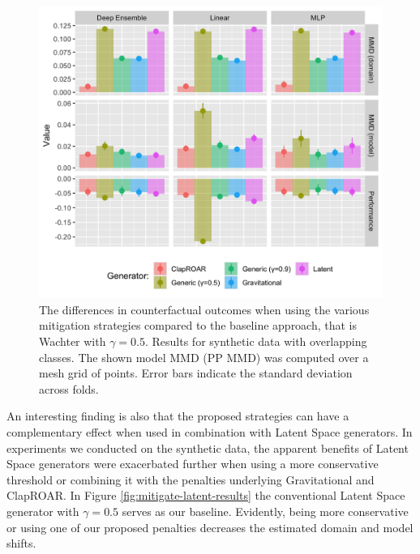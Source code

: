 \documentclass[conference,final,]{IEEEtran}
\theoremstyle{definition}
\theoremstyle{definition}
\theoremstyle{definition}
\theoremstyle{definition}
\theoremstyle{remark}
\begin{document}
\begin{figure}

{\centering \includegraphics[width=0.9\linewidth]{www/mitigation_synthetic_results} 

}

\caption{The differences in counterfactual outcomes when using the various mitigation strategies compared to the baseline approach, that is Wachter with $\gamma=0.5$. Results for synthetic data with overlapping classes. The shown model MMD (PP MMD) was computed over a mesh grid of points. Error bars indicate the standard deviation across folds.}\label{fig:mitigate-results}
\end{figure}

An interesting finding is also that the proposed strategies can have a complementary effect when used in combination with Latent Space generators. In experiments we conducted on the synthetic data, the apparent benefits of Latent Space generators were exacerbated further when using a more conservative threshold or combining it with the penalties underlying Gravitational and ClapROAR. In Figure \ref{fig:mitigate-latent-results} the conventional Latent Space generator with \(\gamma=0.5\) serves as our baseline. Evidently, being more conservative or using one of our proposed penalties decreases the estimated domain and model shifts.
\end{document}
